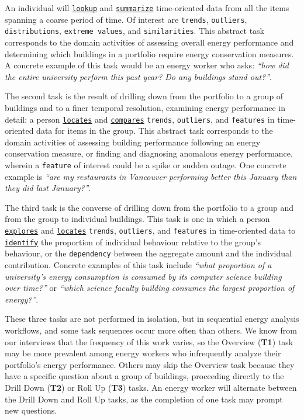 \documentclass[journal]{vgtc}                %
\newcommand{\bstart}[1]{\vspace{1mm} \noindent{\textbf{#1:}}}
\begin{document}
\bstart{T1 / Overview} An individual will \underline{{\tt lookup}} and \underline{{\tt summarize}} time-oriented data from all the items spanning a coarse period of time. 
Of interest are {\tt trends}, {\tt outliers}, {\tt distributions}, {\tt extreme values}, and {\tt similarities}. 
This abstract task corresponds to the domain activities of assessing overall energy performance and determining which buildings in a portfolio require energy conservation measures. 
A concrete example of this task would be an energy worker who asks: {\it ``how did the entire university perform this past year? Do any buildings stand out?''}.

\bstart{T2 / Drill Down} The second task is the result of drilling down from the portfolio to a group of buildings and to a finer temporal resolution, examining energy performance in detail: a person \underline{{\tt locates}} and \underline{{\tt compares}} {\tt trends}, {\tt outliers}, and {\tt features} in time-oriented data for items in the group.
This abstract task corresponds to the domain activities of assessing building performance following an energy conservation measure, or finding and diagnosing anomalous energy performance, wherein a {\tt feature} of interest could be a spike or sudden outage.
One concrete example is {\it ``are my restaurants in Vancouver performing better this January than they did last January?''}.

\bstart{T3 / Roll Up} The third task is the converse of drilling down from the portfolio to a group and from the group to individual buildings.
This task is one in which a person \underline{{\tt explores}} and \underline{{\tt locates}} {\tt trends}, {\tt outliers}, and {\tt features} in time-oriented data to \underline{{\tt identify}} the proportion of individual behaviour relative to the group's behaviour, or the {\tt dependency} between the aggregate amount and the individual contribution.
Concrete examples of this task include {\it ``what proportion of a university's energy consumption is consumed by its computer science building over time?''} or {\it ``which science faculty building consumes the largest proportion of energy?''}.

\bstart{Task sequences} These three tasks are not performed in isolation, but in sequential energy analysis workflows, and some task sequences occur more often than others. 
We know from our interviews that the frequency of this work varies, so the Overview ({\bf T1}) task may be more prevalent among energy workers who infrequently analyze their portfolio's energy performance.
Others may skip the Overview task because they have a specific question about a group of buildings, proceeding directly to the Drill Down ({\bf T2}) or Roll Up ({\bf T3}) tasks. 
An energy worker will alternate between the Drill Down and Roll Up tasks, as the completion of one task may prompt new questions.
\end{document}
